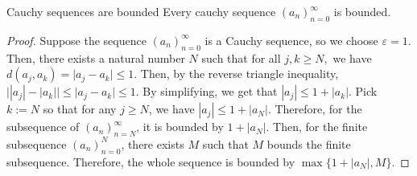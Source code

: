 \begin{problem}{Cauchy sequences are bounded}
    Every cauchy sequence $( a_n )_{n=0}^\infty$ is bounded.
\end{problem}
\begin{proof}
    Suppose the sequence $(a_n )_{n=0}^\infty$ is a Cauchy sequence, so we choose $\varepsilon = 1.$
    Then, there exists a natural number $N$ such that for all $j, k \geq N,$ we have $d(a_j, a_k) = \lvert a_j - a_k \rvert \leq 1.$
    Then, by the reverse triangle inequality, $\lvert |a_j| - |a_k| \rvert \leq \lvert a_j - a_k \rvert \leq 1$. 
    By simplifying, we get that $|a_j| \leq 1 + |a_k|.$
    Pick $k:=N$ so that for any $j \geq N$, we have $|a_j| \leq 1  + |a_N|$.
    Therefore, for the subsequence of $(a_n)_{n=N}^\infty$, it is bounded by $1 + |a_N|.$
    Then, for the finite subsequence $(a_n)_{n=0}^N$, there exists $M$ such that $M$ bounds the finite subsequence.
    Therefore, the whole sequence is bounded by $\max \{1 + |a_N|, M \}$.
\end{proof}
